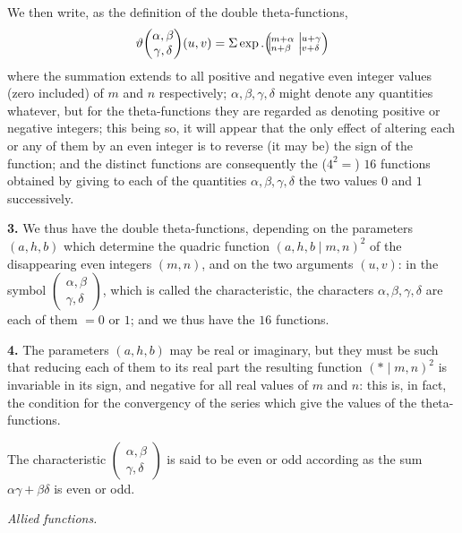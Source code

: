 \documentclass[11pt]{article}
\begin{document}
We then write, as the definition of the double theta-functions,
\[
\vartheta\!\begin{pmatrix} \alpha,\beta \\ \gamma,\delta \end{pmatrix}\!(u,v) = \Sigma\exp.\Bigl(\!\!\bigm|\!\!^{m+\alpha}_{n+\beta}\Bigm|\!\!^{u+\gamma}_{v+\delta}\Bigr)
\]
where the summation extends to all positive and negative even integer values (zero included) of $m$ and $n$ respectively; $\alpha,\beta,\gamma,\delta$ might denote any quantities whatever, but for the theta-functions they are regarded as denoting positive or negative integers; this being so, it will appear that the only effect of altering each or any of them by an even integer is to reverse (it may be) the sign of the function; and the distinct functions are consequently the ($4^2 =$) $16$ functions obtained by giving to each of the quantities $\alpha,\beta,\gamma,\delta$ the two values $0$ and $1$ successively.

\medskip

\textbf{3.} We thus have the double theta-functions, depending on the parameters $(a,h,b)$ which determine the quadric function $(a,h,b\mid m,n)^2$ of the disappearing even integers $(m,n)$, and on the two arguments $(u,v)$: in the symbol $\begin{pmatrix} \alpha,\beta \\ \gamma,\delta \end{pmatrix}$, which is called the characteristic, the characters $\alpha,\beta,\gamma,\delta$ are each of them $= 0$ or $1$; and we thus have the $16$ functions.

\medskip

\textbf{4.} The parameters $(a,h,b)$ may be real or imaginary, but they must be such that reducing each of them to its real part the resulting function $(\ast\mid m,n)^2$ is invariable in its sign, and negative for all real values of $m$ and $n$: this is, in fact, the condition for the convergency of the series which give the values of the theta-functions.

The characteristic $\begin{pmatrix} \alpha,\beta \\ \gamma,\delta \end{pmatrix}$ is said to be even or odd according as the sum $\alpha\gamma + \beta\delta$ is even or odd.

\medskip

\textit{Allied functions.}

\medskip
\end{document}
